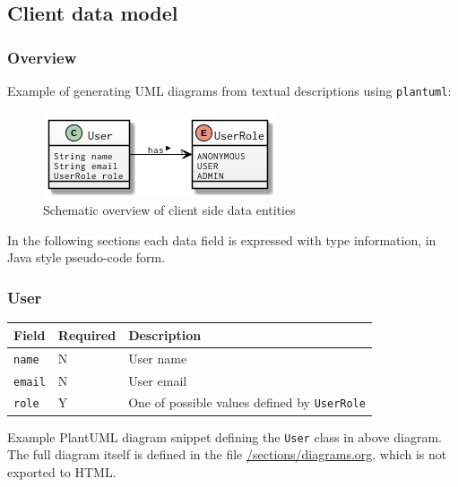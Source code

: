 \documentclass[letterpaper, 9pt, onecolumn, twoside, technote, final]{IEEEtran}
\begin{document}
\subsection{Client data model}
\label{sec:orgba050de}
\subsubsection{Overview}
\label{sec:orgf295f55}

Example of generating UML diagrams from textual descriptions using \texttt{plantuml}:

\begin{figure}[htbp]
\centering
\includegraphics[width=.9\linewidth]{./assets/clientmodel.png}
\caption{Schematic overview of client side data entities}
\end{figure}

In the following sections each data field is expressed with type
information, in Java style pseudo-code form.

\subsubsection{User}
\label{sec:org20dce1a}

\begin{center}
\begin{tabular}{lll}
\textbf{Field} & \textbf{Required} & \textbf{Description}\\
\hline
\texttt{name} & N & User name\\
\texttt{email} & N & User email\\
\texttt{role} & Y & One of possible values defined by \texttt{UserRole}\\
\end{tabular}
\end{center}

Example PlantUML diagram snippet defining the \texttt{User} class in above
diagram. The full diagram itself is defined in the file
\href{https://raw.githubusercontent.com/thi-ng/org-spec/master/sections/diagrams.org}{/sections/diagrams.org}, which is not exported to HTML.
\end{document}
